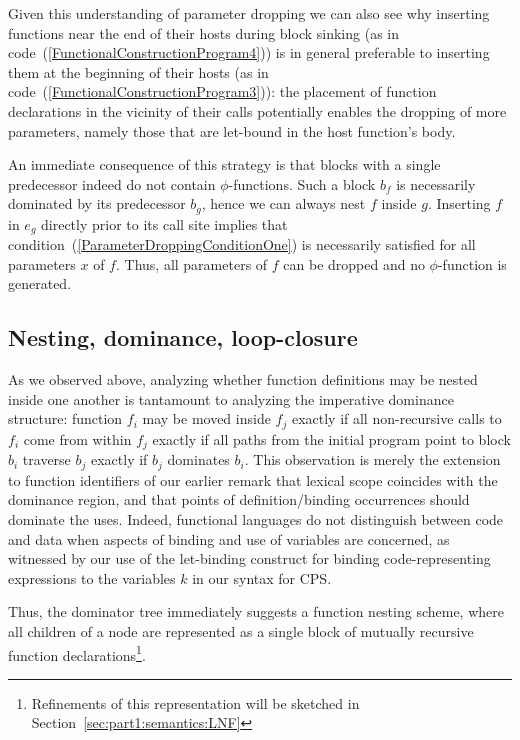 {Given this understanding of parameter dropping we can also see why
inserting functions near the end of their hosts during block sinking
(as in code~(\ref{FunctionalConstructionProgram4})) is in general
preferable to inserting them at the beginning of their hosts (as in
code~(\ref{FunctionalConstructionProgram3})): the placement of
function declarations in the vicinity of their calls potentially
enables the dropping of more parameters, namely those that are
let-bound in the host function's body.

An immediate consequence of this strategy is that blocks with a single
predecessor indeed do not contain $\phi$-functions. Such a block $b_f$
is necessarily dominated by its predecessor $b_g$, hence we can always
nest $f$ inside $g$. Inserting $f$ in $e_g$ directly prior to its call
site implies that condition~(\ref{ParameterDroppingConditionOne}) is
necessarily satisfied for all parameters $x$ of $f$. Thus, all
parameters of $f$ can be dropped and no $\phi$-function is generated.

\subsection{Nesting, dominance, loop-closure}
\label{section:semantics:loopclosure}
As we observed above, analyzing whether function definitions may be
nested inside one another is tantamount to analyzing the imperative
dominance structure: function $f_i$ may be moved inside $f_j$ exactly
if all non-recursive calls to $f_i$ come from within $f_j$ exactly if
all paths from the initial program point to block $b_i$ traverse $b_j$
exactly if $b_j$ dominates $b_i$.  This observation is merely the
extension to function identifiers of our earlier remark that lexical
scope coincides with the dominance region, and that points of
definition/binding occurrences should dominate the uses. Indeed,
functional languages do not distinguish between code and data when
aspects of binding and use of variables are concerned, as witnessed by
our use of the let-binding construct for binding code-representing
expressions to the variables $k$ in our syntax for CPS.

Thus, the dominator tree immediately suggests a function nesting
scheme, where all children of a node are represented as a single block
of mutually recursive function declarations\footnote{Refinements of
this representation will be sketched in
Section~\ref{sec:part1:semantics:LNF}}.

}
